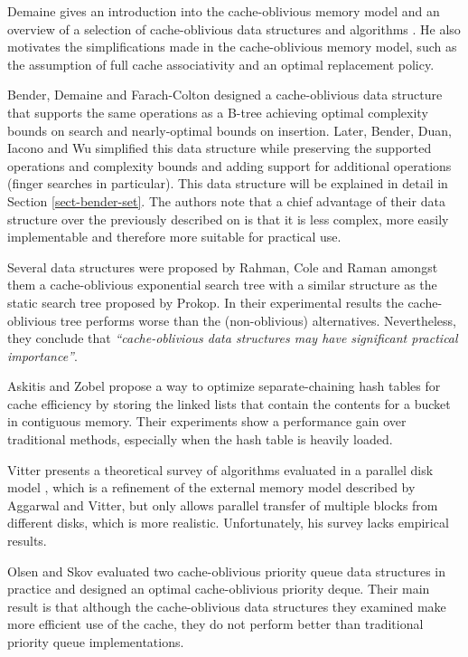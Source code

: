 \documentclass{acm_proc_article-sp}
\begin{document}
Demaine gives an introduction into the cache-oblivious memory model and an overview of a selection of cache-oblivious data structures and algorithms \cite{demaine2002coa}. He also motivates the simplifications made in the cache-oblivious memory model, such as the assumption of full cache associativity and an optimal replacement policy.

Bender, Demaine and Farach-Colton designed a cache-oblivious data structure that supports the same operations as a B-tree \cite{bender2005cob} achieving optimal complexity bounds on search and nearly-optimal bounds on insertion.
Later, Bender, Duan, Iacono and Wu simplified this data structure \cite{bender2004lpc} while preserving the supported operations and complexity bounds and adding support for additional operations (finger searches in particular).
This data structure will be explained in detail in Section \ref{sect-bender-set}.
The authors note that a chief advantage of their data structure over the previously described on is that it is less complex, more easily implementable and therefore more suitable for practical use.

Several data structures were proposed by Rahman, Cole and Raman \cite{rahman2001opd} amongst them a cache-oblivious exponential search tree with a similar structure as the static search tree proposed by Prokop. In their experimental results the cache-oblivious tree performs worse than the (non-oblivious) alternatives. Nevertheless, they conclude that \textit{``cache-obli\-vious data structures may have significant practical importance''}.

Askitis and Zobel \cite{askitis2005ccc} propose a way to optimize separate-chaining hash tables for cache efficiency by storing the linked lists that contain the contents for a bucket in contiguous memory. Their experiments show a performance gain over traditional methods, especially when the hash table is heavily loaded.

Vitter presents a theoretical survey of algorithms evaluated in a parallel disk model \cite{vitter2001ema}, which is a refinement of the external memory model described by Aggarwal and Vitter, but only allows parallel transfer of multiple blocks from different disks, which is more realistic. Unfortunately, his survey lacks empirical results.

Olsen and Skov evaluated two cache-oblivious priority queue data structures in practice \cite{olsen2002coa} and designed an optimal cache-obli\-vious priority deque. Their main result is that although the cache-obli\-vious data structures they examined make more efficient use of the cache, they do not perform better than traditional priority queue implementations.
\end{document}
